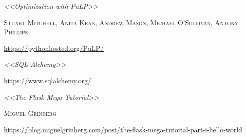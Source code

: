 \documentclass[a4paper]{article}
\begin{document}
\begin{thebibliography}{X}
 \textit{<<Optimization with PuLP>>}

\textsc{Stuart Mitchell, Anita Kean, Andrew Mason, Michael O’Sullivan, Antony Phillips}

\url{https://pythonhosted.org/PuLP/}


 \textit{<<SQL Alchemy>>}

\url{https://www.sqlalchemy.org/}


 \textit{<<The Flask Mega-Tutorial>>}

\textsc{Miguel Grinberg}

\url{https://blog.miguelgrinberg.com/post/the-flask-mega-tutorial-part-i-hello-world}


\end{thebibliography}
\end{document}
